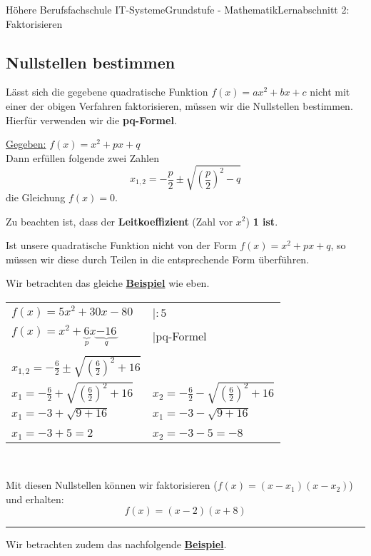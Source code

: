 \documentclass[11pt,twocolumn,oneside,openany,headings=optiontotoc,11pt,numbers=noenddot]{article}
\begin{document}
\begin{worksheet}{Höhere Berufsfachschule IT-Systeme}{Grundstufe - Mathematik}{Lernabschnitt 2: Faktorisieren}
		\subsection{Nullstellen bestimmen}
		Lässt sich die gegebene quadratische Funktion \(f(x) = ax^2 + bx + c\) nicht mit einer der obigen Verfahren faktorisieren, müssen wir die Nullstellen bestimmen.\\
		Hierfür verwenden wir die \textbf{pq-Formel}.
		\begin{framed}
			\noindent
			\underline{Gegeben:} \(f(x) = x^2 + px + q\)\\
			Dann erfüllen folgende zwei Zahlen \[x_{1,2}=-\frac{p}{2} \pm \sqrt{\left(\frac{p}{2}\right)^2 - q}\] die Gleichung \(f(x) = 0\).\\
			\par\noindent
			Zu beachten ist, dass der \textbf{Leitkoeffizient} (Zahl vor \(x^2\)) \textbf{1 ist}.
		\end{framed}
		Ist unsere quadratische Funktion nicht von der Form \(f(x) = x^2 + px + q\), so müssen wir diese durch Teilen in die entsprechende Form überführen.\\
		\par\noindent
		Wir betrachten das gleiche \underline{\textbf{Beispiel}} wie eben.\\
		\par\noindent
		\begin{tabularx}{0.5\textwidth}{Xl}
			\(f(x) = 5x^2 + 30x - 80\) & |\(:5\)\\
			\(f(x) = x^2 + \underbrace{6}_{p}x \underbrace{- 16}_{q}\) & |pq-Formel\\
			\\
			\(x_{1,2} = -\frac{6}{2} \pm \sqrt{\left(\frac{6}{2}\right)^2 +16}\)\\
			\(x_1 = -\frac{6}{2} + \sqrt{\left(\frac{6}{2}\right)^2 +16}\) & \(x_2 = -\frac{6}{2} - \sqrt{\left(\frac{6}{2}\right)^2 +16}\)\\
			\(x_1 = - 3 + \sqrt{9 + 16}\) & \(x_1 = - 3 - \sqrt{9 + 16}\)\\
			\\
			\colorbox{green!10}{\(x_1 = -3 + 5 = 2\)} & \colorbox{green!10}{\(x_2 = -3 - 5 = -8\)}
		\end{tabularx}\\
		\par\noindent
		Mit diesen Nullstellen können wir faktorisieren (\(f(x) = (x-x_1)(x-x_2)\)) und erhalten:
		\[f(x) = (x-2)(x+8)\]
		\rule{0.45\textwidth}{0.1pt}
		Wir betrachten zudem das nachfolgende \underline{\textbf{Beispiel}}.\\

\end{worksheet}
\end{document}
